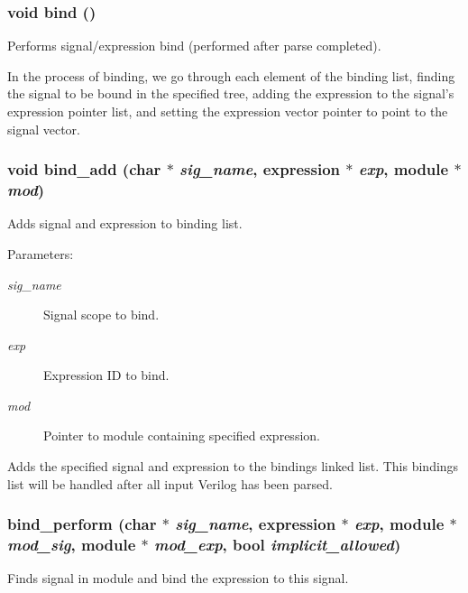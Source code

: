 \subsubsection{\setlength{\rightskip}{0pt plus 5cm}void bind ()}\label{binding_8c_a8}


Performs signal/expression bind (performed after parse completed).

In the process of binding, we go through each element of the binding list, finding the signal to be bound in the specified tree, adding the expression to the signal's expression pointer list, and setting the expression vector pointer to point to the signal vector. 
\subsubsection{\setlength{\rightskip}{0pt plus 5cm}void bind\_\-add (char $\ast$ {\em sig\_\-name}, {\bf expression} $\ast$ {\em exp}, {\bf module} $\ast$ {\em mod})}\label{binding_8c_a5}


Adds signal and expression to binding list.

\begin{Desc}
\item[Parameters: ]\par
\begin{description}
\item[{\em 
sig\_\-name}]Signal scope to bind. \item[{\em 
exp}]Expression ID to bind. \item[{\em 
mod}]Pointer to module containing specified expression.\end{description}
\end{Desc}
Adds the specified signal and expression to the bindings linked list. This bindings list will be handled after all input Verilog has been parsed. 
\subsubsection{ bind\_\-perform (char $\ast$ {\em sig\_\-name}, {\bf expression} $\ast$ {\em exp}, {\bf module} $\ast$ {\em mod\_\-sig}, {\bf module} $\ast$ {\em mod\_\-exp}, {\bf bool} {\em implicit\_\-allowed})}\label{binding_8c_a7}


Finds signal in module and bind the expression to this signal.

